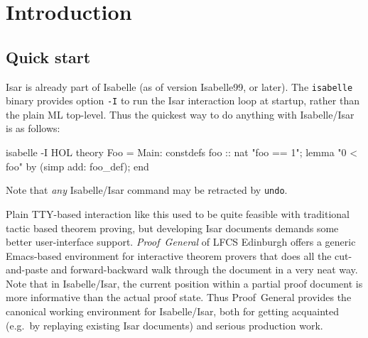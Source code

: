 
\chapter{Introduction}

\section{Quick start}

Isar is already part of Isabelle (as of version Isabelle99, or later).  The
\texttt{isabelle} binary provides option \texttt{-I} to run the Isar
interaction loop at startup, rather than the plain ML top-level.  Thus the
quickest way to do anything with Isabelle/Isar is as follows:
\begin{ttbox}
isabelle -I HOL\medskip
{}\medskip
theory Foo = Main:
constdefs foo :: nat  "foo == 1";
lemma "0 < foo" by (simp add: foo_def);
end
\end{ttbox}
Note that \emph{any} Isabelle/Isar command may be retracted by \texttt{undo}.

Plain TTY-based interaction like this used to be quite feasible with
traditional tactic based theorem proving, but developing Isar documents
demands some better user-interface support.  \emph{Proof~General} of LFCS Edinburgh \cite{proofgeneral} offers a generic Emacs-based
environment for interactive theorem provers that does all the cut-and-paste
and forward-backward walk through the document in a very neat way.  Note that
in Isabelle/Isar, the current position within a partial proof document is more
informative than the actual proof state.  Thus Proof~General provides the
canonical working environment for Isabelle/Isar, both for getting acquainted
(e.g.\ by replaying existing Isar documents) and serious production work.

\medskip

